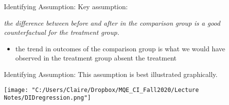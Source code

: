 \documentclass[
  ignorenonframetext,
]{beamer}
\providecommand{\tightlist}{%
  \setlength{\itemsep}{0pt}\setlength{\parskip}{0pt}}
\begin{document}
\begin{frame}{Identifying Assumption:}
\protect\hypertarget{identifying-assumption}{}
Key assumption:

\textit{the difference between before and after in the comparison group is a good counterfactual for the treatment group.}

\begin{itemize}
\tightlist
\item
  the trend in outcomes of the comparison group is what we would have
  observed in the treatment group absent the treatment
\end{itemize}
\end{frame}

\begin{frame}{Identifying Assumption:}
\protect\hypertarget{identifying-assumption-1}{}
This assumption is best illustrated graphically.

\texttt{[image: "C:/Users/Claire/Dropbox/MQE\_CI\_Fall2020/Lecture Notes/DIDregression.png"]}
\end{frame}
\end{document}
